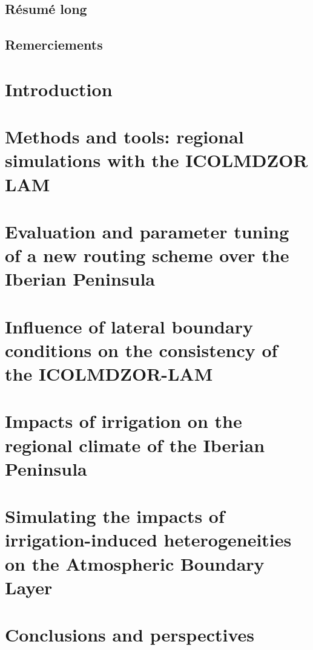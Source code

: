 \documentclass{report}
\begin{document}
\clearpage

\section*{Résumé long}
\section*{Remerciements}

\clearpage
\dominitoc
\renewcommand*\contentsname{Contents}
\tableofcontents
\newpage

\chapter{Introduction}
\label{chap:introduction}
\minitoc
\pagebreak


\chapter{Methods and tools: regional simulations with the ICOLMDZOR LAM}
\label{chap:methods}
\minitoc
\pagebreak


\chapter{Evaluation and parameter tuning of a new routing scheme over the Iberian Peninsula}
\label{chap:routing}
\minitoc
\pagebreak


\chapter{Influence of lateral boundary conditions on the consistency of the ICOLMDZOR-LAM}
\label{chap:forcing}
\minitoc
\pagebreak


\chapter{Impacts of irrigation on the regional climate of the Iberian Peninsula}
\label{chap:monthly}
\minitoc
\pagebreak


\chapter{Simulating the impacts of irrigation-induced heterogeneities on the Atmospheric Boundary Layer}
\label{chap:liaise}
\minitoc
\pagebreak


\chapter{Conclusions and perspectives}
\label{chap:conclusion}




\newpage

\printbibliography

\listoffigures
\newpage
\listoftables
\end{document}
